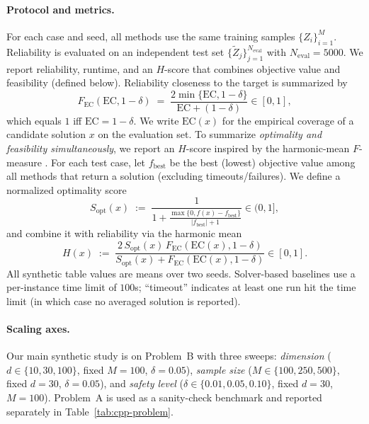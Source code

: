 \documentclass{uai2026} %
\theoremstyle{plain}
\theoremstyle{definition}
\begin{document}
\paragraph{Protocol and metrics.}
For each case and seed, all methods use the same training samples $\{Z_i\}_{i=1}^M$.
Reliability is evaluated on an independent test set $\{\widetilde Z_j\}_{j=1}^{N_{\mathrm{eval}}}$ with $N_{\mathrm{eval}}=5000$.
We report reliability, runtime, and an $H$-score that combines objective value and feasibility (defined below).
Reliability closeness to the target is summarized by
\begin{equation}
  F_{\mathrm{EC}}(\mathrm{EC}, 1-\delta)
  \;=\;
  \frac{2\min\{\mathrm{EC}, 1-\delta\}}{\mathrm{EC} + (1-\delta)}\in[0,1],\label{eq:fscore}
\end{equation}
which equals $1$ iff $\mathrm{EC}=1-\delta$.
We write $\mathrm{EC}(x)$ for the empirical coverage of a candidate solution $x$ on the evaluation set.
To summarize \emph{optimality and feasibility simultaneously}, we report an $H$-score inspired by the harmonic-mean $F$-measure \citep{vanrijsbergen1979information}.
For each test case, let $f_{\mathrm{best}}$ be the best (lowest) objective value among all methods that return a solution (excluding timeouts/failures).
We define a normalized optimality score
\begin{equation}
  S_{\mathrm{opt}}(x)
  \;:=\;
  \frac{1}{1 + \frac{\max\{0,f(x)-f_{\mathrm{best}}\}}{|f_{\mathrm{best}}|+1}}
  \in(0,1],\label{eq:sopt}
\end{equation}
and combine it with reliability via the harmonic mean
\begin{equation}
  H(x)
  \;:=\;
  \frac{2\,S_{\mathrm{opt}}(x)\,F_{\mathrm{EC}}(\mathrm{EC}(x),1-\delta)}{S_{\mathrm{opt}}(x)+F_{\mathrm{EC}}(\mathrm{EC}(x),1-\delta)}\in[0,1].\label{eq:hscore}
\end{equation}
All synthetic table values are means over two seeds.
Solver-based baselines use a per-instance time limit of $100$s; ``timeout'' indicates at least one run hit the time limit (in which case no averaged solution is reported).

\paragraph{Scaling axes.}
Our main synthetic study is on Problem~B with three sweeps:
\emph{dimension} ($d\in\{10,30,100\}$, fixed $M{=}100$, $\delta{=}0.05$),
\emph{sample size} ($M\in\{100,250,500\}$, fixed $d{=}30$, $\delta{=}0.05$),
and \emph{safety level} ($\delta\in\{0.01,0.05,0.10\}$, fixed $d{=}30$, $M{=}100$).
Problem~A is used as a sanity-check benchmark and reported separately in Table~\ref{tab:cpp-problem}.
\end{document}
